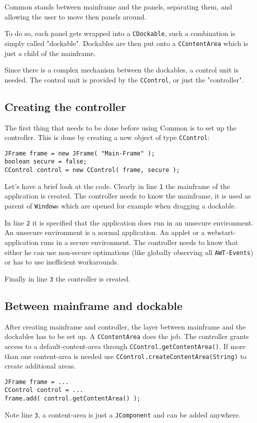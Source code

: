 \documentclass[a4paper,10pt]{article}
\newcommand{\src}[1]{\lstinline[basicstyle=\ttfamily]|#1|}
\begin{document}
Common stands between mainframe and the panels, separating them, and allowing the user to move then panels around.

To do so, each panel gets wrapped into a \src{CDockable}, such a combination is simply called "dockable". Dockables are then put onto a \src{CContentArea} which is just a child of the mainframe.

Since there is a complex mechanism between the dockables, a control unit is needed. The control unit is provided by the \src{CControl}, or just the "controller".

\subsection{Creating the controller}
The first thing that needs to be done before using Common is to set up the controller. This is done by creating a new object of type \src{CControl}:
\begin{lstlisting}
JFrame frame = new JFrame( "Main-Frame" );
boolean secure = false;
CControl control = new CControl( frame, secure );
\end{lstlisting}

Let's have a brief look at the code. Clearly in line \src{1} the mainframe of the application is created. The controller needs to know the mainframe, it is used as parent of \src{Window}s which are opened for example when dragging a dockable.

In line \src{2} it is specified that the application does run in an unsecure environment. An unsecure environment is a normal application. An applet or a webstart-application runs in a secure environment. The controller needs to know that either he can use non-secure optimations (like globally observing all \src{AWT-Events}) or has to use inefficient workarounds.

Finally in line \src{3} the controller is created.

\subsection{Between mainframe and dockable}
After creating mainframe and controller, the layer between mainframe and the dockables has to be set up. A \src{CContentArea} does the job. The controller grants access to a default-content-area through \src{CControl.getContentArea()}. If more than one content-area is needed use \src{CControl.createContentArea(String)} to create additional areas.
\begin{lstlisting}
JFrame frame = ...
CControl control = ...	
frame.add( control.getContentArea() );
\end{lstlisting}
Note line \src{3}, a content-area is just a \src{JComponent} and can be added anywhere.
\end{document}
